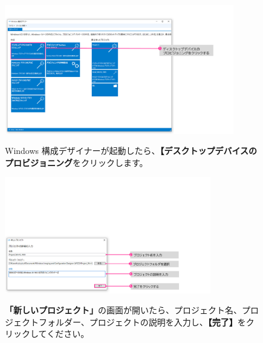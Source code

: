\begin{figure}[hp]
    \begin{minipage}{0.6\textwidth}
        \vspace{0cm}
        \includegraphics[width=10cm]{figures/MakeProvisioningPackage-02}
    \end{minipage}
    \begin{minipage}{0.4\textwidth}
        Windows 構成デザイナーが起動したら、\textbf{【デスクトップデバイスのプロビジョニング}をクリックします。
    \end{minipage}
\end{figure}


\begin{figure}[hp]
    \begin{minipage}{0.6\textwidth}
        \vspace{-2.5cm}
        \includegraphics[width=9cm]{figures/MakeProvisioningPackage-03}
    \end{minipage}
    \begin{minipage}{0.4\textwidth}
        \textbf{「新しいプロジェクト」}の画面が開いたら、プロジェクト名、プロジェクトフォルダー、プロジェクトの説明を入力し、\textbf{【完了】}をクリックしてください。
    \end{minipage}
\end{figure}

